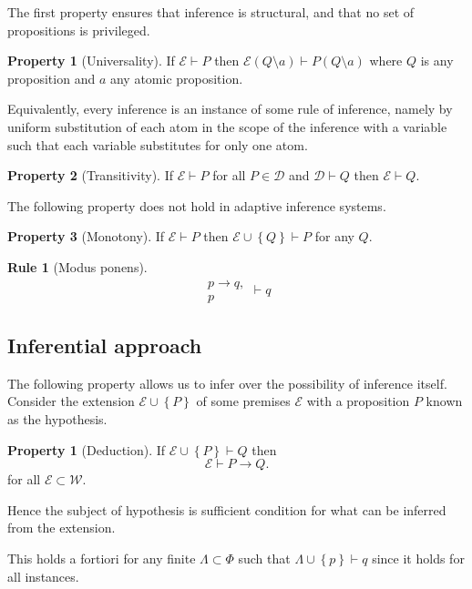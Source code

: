 \documentclass{amsbook}
\newcommand{\setsm}[1]{\left\{#1\right\}}
\newcommand{\wffs}{\mathcal W}
\newcommand{\infers}{\mathrel\vdash}
\newcommand{\then}{\mathrel\rightarrow}
\theoremstyle{definition}
\newtheorem{prop}{Property}[section]
\newtheorem{subprop}{Property}[subsection]
\newtheorem{frule}{Rule}[chapter]
\begin{document}
The first property ensures that inference is structural, and that no set of propositions is privileged.

\begin{prop}[Universality]
    If $\mathcal E \infers P$ then $\mathcal E(Q \setminus a) \infers P(Q \setminus a)$ where $Q$ is any proposition and $a$ any atomic proposition.
\end{prop}

Equivalently, every inference is an instance of some rule of inference, namely by uniform substitution of each atom in the scope of the inference with a variable such that each variable substitutes for only one atom.

\begin{prop}[Transitivity]
    If $\mathcal E \infers P$ for all $P \in \mathcal D$ and $\mathcal D \infers Q$ then $\mathcal E \infers Q$.
\end{prop}

The following property does not hold in adaptive inference systems.

\begin{prop}[Monotony]
    If $\mathcal E \infers P$ then $\mathcal E \cup \setsm Q \infers P$ for any $Q$.
\end{prop}

\begin{frule}[Modus ponens]
    $$\begin{aligned}p \rightarrow q, \\ p\end{aligned} \infers q$$
\end{frule}

\subsection{Inferential approach}

The following property allows us to infer over the possibility of inference itself. Consider the extension $\mathcal E \cup\setsm P$ of some premises $\mathcal E$ with a proposition $P$ known as the hypothesis.

\begin{subprop}[Deduction]
    If $\mathcal E \cup\setsm P \infers Q$ then
    $$\mathcal E \infers P \then Q.$$
    for all $\mathcal E \subset \wffs$.
\end{subprop}

Hence the subject of hypothesis is sufficient condition for what can be inferred from the extension.

This holds a fortiori for any finite $\varLambda \subset \Phi$ such that $\varLambda \cup \setsm p \infers q$ since it holds for all instances.
\end{document}

